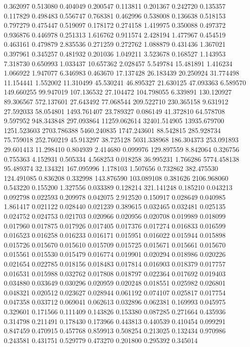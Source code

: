 0.362097
0.513080
0.404049
0.200547
0.113811
0.201367
0.242720
0.135357
0.117829
0.498483
0.556747
0.768381
0.462996
0.538008
0.136638
0.518153
0.797279
0.475447
0.519097
0.178172
0.274158
1.419975
0.350088
0.497372
0.936876
0.446978
0.251313
1.616762
0.911574
2.428194
1.477967
0.454519
0.463161
0.479879
2.835536
0.271259
0.272762
1.088879
0.431436
1.367021
0.397961
0.345257
0.481932
0.201036
1.049211
3.523678
0.168527
1.143953
7.318730
0.650993
1.033437
10.657362
2.028457
5.549784
15.481891
1.416234
1.066922
1.947077
6.346983
0.463670
17.137428
26.183439
20.250924
31.774498
11.154441
1.552002
11.310499
45.530241
46.895327
21.630125
47.093363
6.589570
149.660255
99.947019
107.136532
27.104472
104.798055
6.339891
130.120927
89.306567
572.137601
27.643492
77.068544
209.522710
230.365158
9.631912
27.592033
58.054801
1493.761407
23.789327
0.086149
41.372810
64.578708
9.597952
948.343848
297.093864
11259.062614
32401.514905
13935.679700
1251.523603
2703.786388
5460.240835
1747.243601
88.542815
285.928734
75.759018
252.760219
45.913297
38.725128
5031.338968
186.304373
253.091893
29.601413
11.298410
0.804939
2.414680
0.099976
129.897559
8.842064
0.326756
0.755363
4.152931
0.505334
4.568253
0.018258
36.995231
1.766286
5774.458138
95.489374
32.134321
167.095996
1.178103
1.507656
0.732862
382.475530
124.491085
0.836208
0.332998
143.876590
103.089108
0.381626
2106.968060
0.543220
0.155200
1.327556
0.033389
0.128214
321.141248
0.185210
0.043213
0.092798
0.022593
0.209978
0.042075
2.912520
0.150917
0.028649
0.040985
1.861417
0.021122
0.028440
0.021239
0.389615
0.032465
0.032481
0.025135
0.024752
0.024753
0.021703
0.020966
0.020956
0.020708
0.019989
0.018099
0.017960
0.017875
0.017926
0.017405
0.017376
0.017274
0.016833
0.016599
0.016523
0.016258
0.016233
0.016171
0.015951
0.016022
0.015944
0.015898
0.015726
0.015670
0.015610
0.015709
0.015725
0.015671
0.015661
0.015670
0.015561
0.015530
0.015479
0.016774
0.019901
0.020294
0.018986
0.020226
0.021654
0.022785
0.018156
0.018483
0.017814
0.016903
0.018379
0.017757
0.016531
0.015988
0.032762
0.017808
0.018797
0.022364
0.017692
0.019403
0.034880
0.033649
0.030296
0.020959
0.020248
0.018551
0.025982
0.026801
0.048321
0.020512
0.023627
0.028944
0.061192
0.074107
0.025817
0.017754
0.047358
0.033712
0.069041
0.062613
0.032896
0.062381
0.169993
0.045975
0.329601
0.171566
0.111409
0.143826
0.153380
0.087285
0.271664
0.435936
0.314798
0.211491
0.178430
0.173966
0.443813
0.440539
0.410454
0.099291
0.847459
0.470915
0.457768
0.859913
0.508254
0.213025
0.132434
0.970986
0.243581
0.431751
0.529779
0.473270
0.201800
0.295392
0.345014
